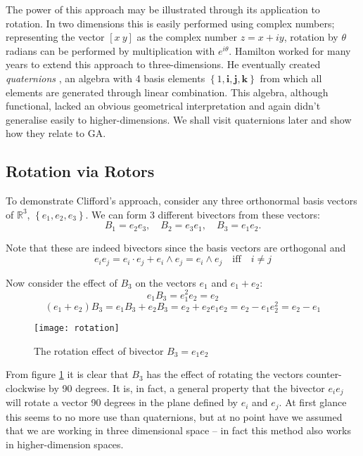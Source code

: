 The power of this approach may be illustrated through its application to
rotation. In two dimensions this is easily performed using complex numbers;
representing the vector $[x\ y]$ as the complex number $z = x + iy$, rotation
by $\theta$ radians can be performed by multiplication with $e^{i\theta}$.
Hamilton worked for many years to extend this approach to
three-dimensions. He eventually created \emph{quaternions}
\cite{hamilton2,hamilton1}, an algebra with 4 basis elements $\left\{1,
\mathbf{i}, \mathbf{j}, \mathbf{k}\right\}$ from which all elements are
generated through linear combination. This algebra, although functional,
lacked an obvious geometrical interpretation and again didn't generalise
easily to higher-dimensions. We shall visit quaternions later and show how they relate to GA.

\subsection{Rotation via Rotors}

To demonstrate Clifford's approach, consider any three orthonormal basis
vectors of $\mathbb{R}^3$, $\left\{e_1, e_2, e_3\right\}$. We can form
3 different bivectors from these vectors:
\begin{displaymath}
B_1 = e_2e_3,\quad B_2 = e_3e_1,\quad B_3 = e_1e_2.
\end{displaymath}

Note that these are indeed bivectors since the basis vectors are orthogonal and
\[
e_ie_j = e_i \cdot e_j + e_i \wedge e_j = e_i \wedge e_j \quad \mbox{iff} \quad i \ne j
\]

Now consider the effect of $B_3$ on the vectors $e_1$ and $e_1 + e_2$:
\begin{displaymath}
e_1B_3 = e_1^2e_2=e_2 
\end{displaymath}
\begin{displaymath}
(e_1 + e_2)B_3 = e_1B_3 + e_2B_3 = e_2 + e_2e_1e_2 = e_2 - e_1e_2^2 = e_2 - e_1
\end{displaymath}

\begin{figure}
\centering
\texttt{[image: rotation]}
\caption{The rotation effect of bivector $B_3 = e_1e_2$\label{fig:rotation}}
\end{figure}

From figure \ref{fig:rotation} it is clear that $B_3$ has the effect
of rotating the vectors counter-clockwise by 90 degrees. It is, in fact, a
general property that the bivector $e_ie_j$ will rotate a vector 90 degrees in
the plane defined by $e_i$ and $e_j$. At first glance this seems to 
no more use than quaternions, but at no point have we assumed that we are
working in three dimensional space -- in fact this method also works in higher-dimension
spaces.

